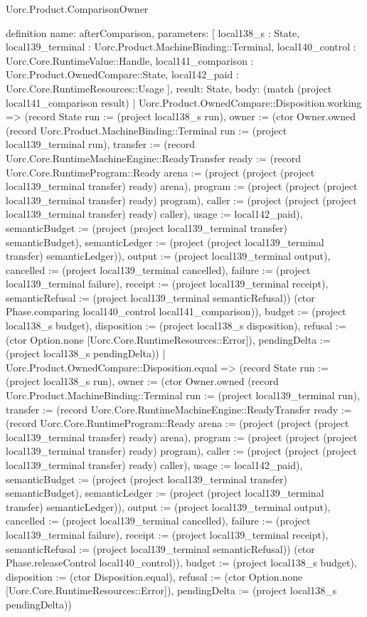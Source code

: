 \begin{lexlean}{Uorc.Product.ComparisonOwner}
\begin{semanticmodule}
definition{
  name: afterComparison,
  parameters: [
    local138_s : State,
    local139_terminal : Uorc.Product.MachineBinding::Terminal,
    local140_control : Uorc.Core.RuntimeValue::Handle,
    local141_comparison : Uorc.Product.OwnedCompare::State,
    local142_paid : Uorc.Core.RuntimeResources::Usage
  ],
  result: State,
  body: (match (project local141_comparison result)
    | Uorc.Product.OwnedCompare::Disposition.working => (record State {run := (project local138_s run), owner := (ctor Owner.owned (record Uorc.Product.MachineBinding::Terminal {run := (project local139_terminal run), transfer := (record Uorc.Core.RuntimeMachineEngine::ReadyTransfer {ready := (record Uorc.Core.RuntimeProgram::Ready {arena := (project (project (project local139_terminal transfer) ready) arena), program := (project (project (project local139_terminal transfer) ready) program), caller := (project (project (project local139_terminal transfer) ready) caller), usage := local142_paid}), semanticBudget := (project (project local139_terminal transfer) semanticBudget), semanticLedger := (project (project local139_terminal transfer) semanticLedger)}), output := (project local139_terminal output), cancelled := (project local139_terminal cancelled), failure := (project local139_terminal failure), receipt := (project local139_terminal receipt), semanticRefusal := (project local139_terminal semanticRefusal)}) (ctor Phase.comparing local140_control local141_comparison)), budget := (project local138_s budget), disposition := (project local138_s disposition), refusal := (ctor Option.none [Uorc.Core.RuntimeResources::Error]), pendingDelta := (project local138_s pendingDelta)})
    | Uorc.Product.OwnedCompare::Disposition.equal => (record State {run := (project local138_s run), owner := (ctor Owner.owned (record Uorc.Product.MachineBinding::Terminal {run := (project local139_terminal run), transfer := (record Uorc.Core.RuntimeMachineEngine::ReadyTransfer {ready := (record Uorc.Core.RuntimeProgram::Ready {arena := (project (project (project local139_terminal transfer) ready) arena), program := (project (project (project local139_terminal transfer) ready) program), caller := (project (project (project local139_terminal transfer) ready) caller), usage := local142_paid}), semanticBudget := (project (project local139_terminal transfer) semanticBudget), semanticLedger := (project (project local139_terminal transfer) semanticLedger)}), output := (project local139_terminal output), cancelled := (project local139_terminal cancelled), failure := (project local139_terminal failure), receipt := (project local139_terminal receipt), semanticRefusal := (project local139_terminal semanticRefusal)}) (ctor Phase.releaseControl local140_control)), budget := (project local138_s budget), disposition := (ctor Disposition.equal), refusal := (ctor Option.none [Uorc.Core.RuntimeResources::Error]), pendingDelta := (project local138_s pendingDelta)})
}
\end{semanticmodule}
\end{lexlean}
